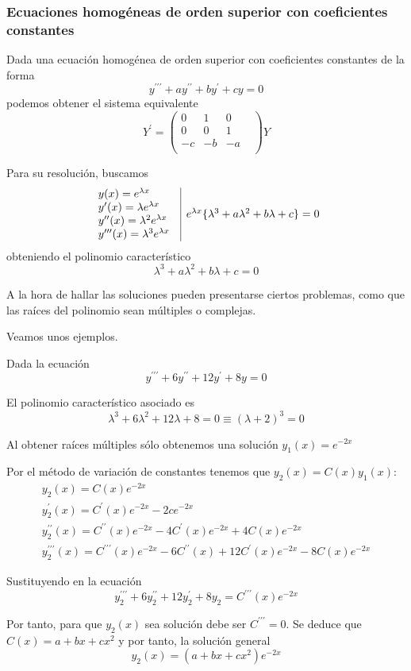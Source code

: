 \documentclass{mathnotes}
\begin{document}
\subsubsection{Ecuaciones homogéneas de orden superior con coeficientes constantes}
Dada una ecuación homogénea de orden superior con coeficientes constantes de la forma
 $$y^{\prime\prime\prime} + ay^{\prime\prime}+by^{\prime}+cy = 0$$ podemos obtener el sistema equivalente
$$Y^\prime = \begin{pmatrix}
0& 1& 0\\
0& 0& 1&\\
-c& -b& -a\\
\end{pmatrix}Y$$

Para su resolución, buscamos
$$\begin{array}{c | c}

\begin{array}{l}
y(x) = e^{\lambda x}\\
y^\prime(x) = \lambda e^{\lambda x}\\
y^{\prime\prime}(x) = \lambda^2 e^{\lambda x}\\
y^{\prime\prime\prime}(x) = \lambda^3 e^{\lambda x}\\
\end{array} & e^{\lambda x} \{ \lambda^3 + a\lambda^2 + b \lambda + c \} = 0
\end{array}
$$
obteniendo el polinomio característico $$\lambda^3 + a\lambda^2 + b \lambda + c = 0$$

A la hora de hallar las soluciones pueden presentarse ciertos problemas, como que las raíces del polinomio sean múltiples o complejas.

Veamos unos ejemplos.

\begin{example}
Dada la ecuación
$$y^{\prime\prime\prime} + 6 y^{\prime\prime} + 12y^\prime + 8y = 0$$

El polinomio característico asociado es $$ \lambda^3 + 6\lambda^2 + 12\lambda + 8 = 0 \equiv (\lambda + 2)^3 = 0$$

Al obtener raíces múltiples sólo obtenemos una solución $y_1(x) = e^{-2x}$

Por el método de variación de constantes tenemos que $y_2(x) = C(x) y_1(x)$:
$$\begin{array}{l}
y_2(x) = C(x) e^{-2x}\\
y_2^\prime(x) = C^\prime(x) e^{-2x}-2ce^{-2x}\\
y_2^{\prime\prime}(x) = C^{\prime\prime}(x) e^{-2x}-4C^\prime(x) e^{-2x}+4C(x)e^{-2x}\\
y_2^{\prime\prime\prime}(x) = C^{\prime\prime\prime}(x) e^{-2x}-6C^{\prime\prime}(x) +12C^\prime(x) e^{-2x}-8C(x)e^{-2x}
\end{array}
$$

Sustituyendo en la ecuación $$y^{\prime\prime\prime}_2+6y^{\prime\prime}_2+12y^\prime_2+8y_2 = C^{\prime\prime\prime}(x) e^{-2x}$$

Por tanto, para que $y_2(x)$ sea solución debe ser $C^{\prime\prime\prime} = 0$. Se deduce que $C(x) = a+bx+cx^2$ y por tanto, la solución general $$y_2(x) = (a+bx+cx^2)e^{-2x}$$
\end{example}
\end{document}
